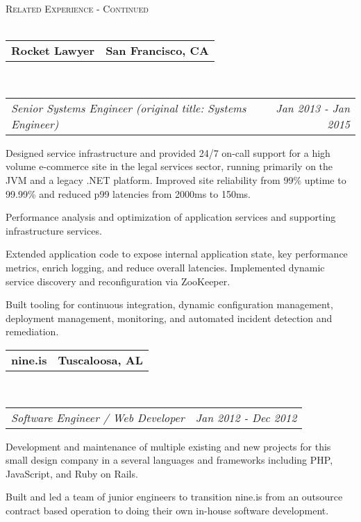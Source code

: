 \documentclass[10pt,letterpaper]{article}
\makeatletter
\newcommand{\lineunder}{\vspace*{-8pt} \\ \hspace*{-18pt} \hrulefill \\}
\newcommand{\header}[1]{{\hspace*{-15pt}\vspace*{6pt} \textsc{#1}} \vspace*{-6pt} \lineunder}
\newcommand{\headerrow}[2]
{\begin{tabular*}{\linewidth}{l@{\extracolsep{\fill}}r}
	#1 &
	#2 \\
\end{tabular*}}
\newcommand{\employment}[5]{
	\headerrow
		{\textbf{#1}}
		{\textbf{#2}}
	\\
	\headerrow
		{\emph{#3}}
		{\emph{#4}}
	\begin{itemize*}
		\item #5
	\end{itemize*}
}
\makeatother
\begin{document}
\header{Related Experience - Continued}
\employment{Rocket Lawyer}{San Francisco, CA}{Senior Systems Engineer (original
  title: Systems Engineer)}{Jan 2013 - Jan 2015}{
Designed service infrastructure and provided 24/7 on-call support for a high
volume e-commerce site in the legal services sector, running primarily on the
JVM and a legacy .NET platform. Improved site reliability from 99\% uptime to 99.99\%
and reduced p99 latencies from 2000ms to 150ms.
\item Performance analysis and optimization of application services and supporting infrastructure services.
\item Extended application code to expose internal application
  state, key performance metrics, enrich logging, and reduce overall latencies.
  Implemented dynamic service discovery and reconfiguration via ZooKeeper.
\item Built tooling for continuous integration, dynamic configuration
  management, deployment management, monitoring, and automated incident
  detection and remediation.
}

\employment{nine.is}{Tuscaloosa, AL}{Software Engineer / Web Developer}{Jan 2012 - Dec 2012}{
Development and maintenance of multiple existing and new projects for this small design company in a several languages and frameworks including PHP, JavaScript, and Ruby on Rails.
\item Built and led a team of junior engineers to transition nine.is from an
  outsource contract based operation to doing their own in-house software development.
}
\end{document}
